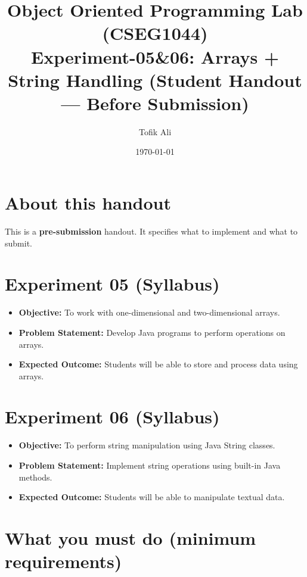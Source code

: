 \documentclass[11pt]{article}
\title{Object Oriented Programming Lab (CSEG1044)\\Experiment-05\&06: Arrays + String Handling (Student Handout --- Before Submission)}
\author{Tofik Ali}
\date{\today}
\begin{document}
\maketitle
\tableofcontents

\section{About this handout}
This is a \textbf{pre-submission} handout.
It specifies what to implement and what to submit.

\section{Experiment 05 (Syllabus)}
\begin{itemize}[leftmargin=*]
  \item \textbf{Objective:} To work with one-dimensional and two-dimensional arrays.
  \item \textbf{Problem Statement:} Develop Java programs to perform operations on arrays.
  \item \textbf{Expected Outcome:} Students will be able to store and process data using arrays.
\end{itemize}

\section{Experiment 06 (Syllabus)}
\begin{itemize}[leftmargin=*]
  \item \textbf{Objective:} To perform string manipulation using Java String classes.
  \item \textbf{Problem Statement:} Implement string operations using built-in Java methods.
  \item \textbf{Expected Outcome:} Students will be able to manipulate textual data.
\end{itemize}

\section{What you must do (minimum requirements)}
\end{document}
